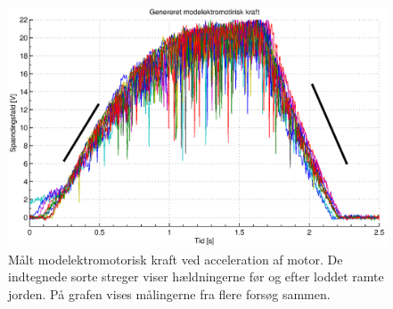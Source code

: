 \begin{figure}[th!]
	\centering
	\includegraphics[width=1\textwidth]{./graphics/vemf0.eps}
	\caption[Målt modelektromotorisk kraft ved acceleration af motor]
		{Målt modelektromotorisk kraft ved acceleration af motor.
		De indtegnede sorte streger viser hældningerne før og efter loddet ramte jorden.
		På grafen vises målingerne fra flere forsøg sammen.}
	\label{fig:vemf0}
\end{figure}
